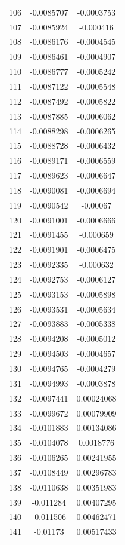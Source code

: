 \documentclass[a4paper, 11pt, oneside]{report}
\begin{document}
{\begin{longtable}{|c|c|c|}
106 & -0.0085707 & -0.0003753 \\
107 & -0.0085924 & -0.000416  \\
108 & -0.0086176 & -0.0004545 \\
109 & -0.0086461 & -0.0004907 \\
110 & -0.0086777 & -0.0005242 \\
111 & -0.0087122 & -0.0005548 \\
112 & -0.0087492 & -0.0005822 \\
113 & -0.0087885 & -0.0006062 \\
114 & -0.0088298 & -0.0006265 \\
115 & -0.0088728 & -0.0006432 \\
116 & -0.0089171 & -0.0006559 \\
117 & -0.0089623 & -0.0006647 \\
118 & -0.0090081 & -0.0006694 \\
119 & -0.0090542 & -0.00067   \\
120 & -0.0091001 & -0.0006666 \\
121 & -0.0091455 & -0.000659  \\
122 & -0.0091901 & -0.0006475 \\
123 & -0.0092335 & -0.000632  \\
124 & -0.0092753 & -0.0006127 \\
125 & -0.0093153 & -0.0005898 \\
126 & -0.0093531 & -0.0005634 \\
127 & -0.0093883 & -0.0005338 \\
128 & -0.0094208 & -0.0005012 \\
129 & -0.0094503 & -0.0004657 \\
130 & -0.0094765 & -0.0004279 \\
131 & -0.0094993 & -0.0003878 \\
132 & -0.0097441 & 0.00024068 \\
133 & -0.0099672 & 0.00079909 \\
134 & -0.0101883 & 0.00134086 \\
135 & -0.0104078 & 0.0018776  \\
136 & -0.0106265 & 0.00241955 \\
137 & -0.0108449 & 0.00296783 \\
138 & -0.0110638 & 0.00351983 \\
139 & -0.011284  & 0.00407295 \\
140 & -0.011506  & 0.00462471 \\
141 & -0.01173   & 0.00517433 \\

\end{longtable}}
\end{document}
